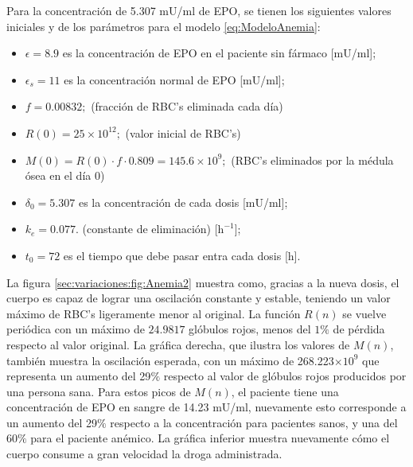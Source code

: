 Para la concentración de 5.307 mU/ml de EPO, se tienen los siguientes valores iniciales y de los parámetros para el modelo \ref{eq:ModeloAnemia}:

\begin{itemize}
    \item $\epsilon = 8.9$ es la concentración de EPO en el paciente sin fármaco [mU/ml];
    \item $\epsilon_s = 11$ es la concentración normal de EPO [mU/ml];
    \item $f=0.00832;$ (fracción de RBC's eliminada cada día)
    \item $R(0) = 25\times 10^{12};$ (valor inicial de RBC's)
    \item $M(0) = R(0)\cdot f \cdot 0.809 = 145.6\times 10^{9};$ (RBC's eliminados por la médula ósea en el día 0)
    \item $\delta_0=5.307$ es la concentración de cada dosis [mU/ml];
    \item $k_e=0.077.$ (constante de eliminación) [$\textrm{h}^{-1}$];
    \item $t_0=72$ es el tiempo que debe pasar entra cada dosis [h].
\end{itemize}

La figura \ref{sec:variaciones:fig:Anemia2} muestra como, gracias a la nueva dosis, el cuerpo es capaz de lograr una oscilación constante y estable, teniendo un valor máximo de RBC's ligeramente menor al original. La función $R(n)$ se vuelve periódica con un máximo de $24.9817$ glóbulos rojos, menos del $1\%$ de pérdida respecto al valor original. La gráfica derecha, que ilustra los valores de $M(n)$, también muestra la oscilación esperada, con un máximo de 268.223$\times 10^{9}$ que representa un aumento del 29$\%$ respecto al valor de glóbulos rojos producidos por una persona sana. Para estos picos de $M(n)$, el paciente tiene una concentración de EPO en sangre de 14.23 mU/ml, nuevamente esto corresponde a un aumento del 29$\%$ respecto a la concentración para pacientes sanos, y una del 60$\%$ para el paciente anémico. La gráfica inferior muestra nuevamente cómo el cuerpo consume a gran velocidad la droga administrada. 

